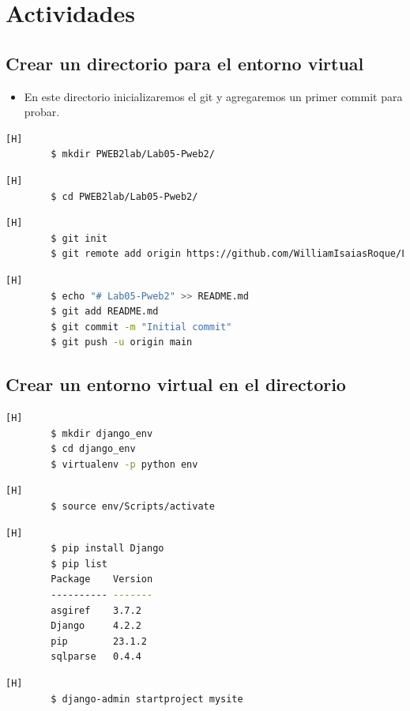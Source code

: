 \documentclass{article}
\begin{document}
	\section{Actividades}

	\subsection{Crear un directorio para el entorno virtual}
	\begin{itemize}	
		\item En este directorio inicializaremos el git y agregaremos un primer commit para probar.
	\end{itemize}	
		
	\begin{lstlisting}[language=bash,caption={Creando directorio de trabajo y accediendo en él}][H]
		$ mkdir PWEB2lab/Lab05-Pweb2/
	\end{lstlisting}
	\begin{lstlisting}[language=bash,caption={Dirijiéndonos al directorio de trabajo}][H]
		$ cd PWEB2lab/Lab05-Pweb2/
	\end{lstlisting}	
	\begin{lstlisting}[language=bash,caption={Inicializando el repositorio Git y agregando remote add origin}][H]
		$ git init
		$ git remote add origin https://github.com/WilliamIsaiasRoque/Lab05-Pweb2.git
	\end{lstlisting}
        \begin{lstlisting}[language=bash,caption={Añadiendo un README.md como primer push}][H]
		$ echo "# Lab05-Pweb2" >> README.md
		$ git add README.md
		$ git commit -m "Initial commit"
		$ git push -u origin main
	\end{lstlisting}

        \subsection{Crear un entorno virtual en el directorio}
        \begin{lstlisting}[language=bash,caption={Creando el directorio django\_env y accediendo en esa carpeta}][H]
		$ mkdir django_env
		$ cd django_env
		$ virtualenv -p python env
	\end{lstlisting}        	
        \begin{lstlisting}[language=bash,caption={Activando el entorno virtual con source}][H]
		$ source env/Scripts/activate
	\end{lstlisting} 
        \begin{lstlisting}[language=bash,caption={Instalando Django con pip}][H]
		$ pip install Django
		$ pip list
		Package    Version
		---------- -------
		asgiref    3.7.2
		Django     4.2.2
		pip        23.1.2
		sqlparse   0.4.4
	\end{lstlisting}
        \begin{lstlisting}[language=bash,caption={Creando un proyecto Django llamado mysite}][H]
		$ django-admin startproject mysite
	\end{lstlisting} 
        
\end{document}
